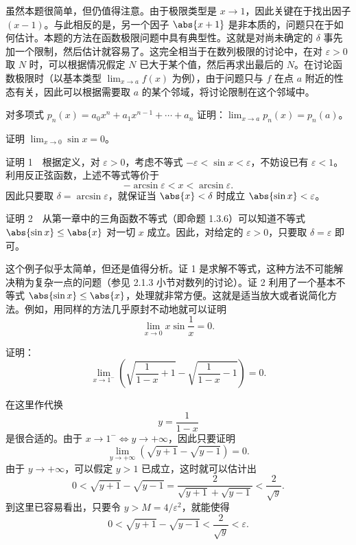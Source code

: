 \begin{xremark}
虽然本题很简单，但仍值得注意。由于极限类型是 $x\to1$，因此关键在于找出因子 $(x-1)$。与此相反的是，另一个因子 $\abs{x+1}$ 是非本质的，问题只在于如何估计。本题的方法在函数极限问题中具有典型性。这就是对尚未确定的 $\delta$ 事先加一个限制，然后估计就容易了。这完全相当于在数列极限的讨论中，在对 $\varepsilon>0$ 取 $N$ 时，可以根据情况假定 $N$ 已大于某个值，然后再求出最后的 $N$。在讨论函数极限时（以基本类型 $\lim_{x\to a}f(x)$ 为例），由于问题只与 $f$ 在点 $a$ 附近的性态有关，因此可以根据需要取 $a$ 的某个邻域，将讨论限制在这个邻域中。
\end{xremark}

\begin{xthought}
对多项式 $p_n(x)=a_0x^n+a_1x^{n-1}+\cdots+a_n$ 证明：$\lim_{x\to a}p_n(x)=p_n(a)$。
\end{xthought}

\begin{xexample}[4.1.3]
证明 $\lim_{x\to0}\sin x=0$。
\end{xexample}
\begin{xproof}
证明 1　根据定义，对 $\varepsilon>0$，考虑不等式 $-\varepsilon<\sin x<\varepsilon$，不妨设已有 $\varepsilon<1$。利用反正弦函数，上述不等式等价于
\[
  -\arcsin\varepsilon<x<\arcsin\varepsilon.
\]
因此只要取 $\delta=\arcsin\varepsilon$，就保证当 $\abs{x}<\delta$ 时成立 $\abs{\sin x}<\varepsilon$。

证明 2　从第一章中的三角函数不等式（即命题 1.3.6）可以知道不等式 $\abs{\sin x}\leq\abs{x}$ 对一切 $x$ 成立。因此，对给定的 $\varepsilon>0$，只要取 $\delta=\varepsilon$ 即可。
\end{xproof}

\begin{xremark}
这个例子似乎太简单，但还是值得分析。证 1 是求解不等式，这种方法不可能解决稍为复杂一点的问题（参见 2.1.3 小节对数列的讨论）。证 2 利用了一个基本不等式 $\abs{\sin x}\leq\abs{x}$，处理就非常方便。这就是适当放大或者说简化方法。例如，用同样的方法几乎原封不动地就可以证明
\[
  \lim_{x\to0}x\sin\frac1x=0.
\]
\end{xremark}

\begin{xexample}[4.1.4]
证明：
\[
  \lim_{x\to1^-}\left(\sqrt{\frac1{1-x}+1}-\sqrt{\frac1{1-x}-1}\right)=0.
\]
\end{xexample}
\begin{xproof}
在这里作代换
\[
  y=\frac1{1-x}
\]
是很合适的。由于 $x\to1^-\Longleftrightarrow y\to+\infty$，因此只要证明
\[
  \lim_{y\to+\infty}(\sqrt{y+1}-\sqrt{y-1})=0.
\]
由于 $y\to+\infty$，可以假定 $y>1$ 已成立，这时就可以估计出
\[
  0<\sqrt{y+1}-\sqrt{y-1}=\frac2{\sqrt{y+1}+\sqrt{y-1}}<\frac2{\sqrt y}.
\]
到这里已容易看出，只要令 $y>M=4/\varepsilon^2$，就能使得
\[
  0<\sqrt{y+1}-\sqrt{y-1}<\frac2{\sqrt y}<\varepsilon.
\]
\end{xproof}

